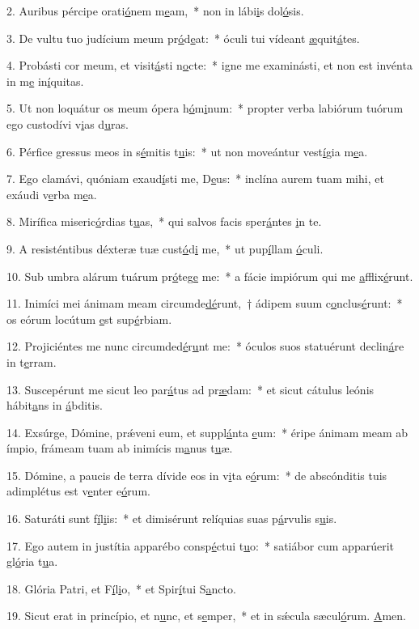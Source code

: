 2. Auribus pércipe orati\uline{ó}nem m\uline{e}am,~* non in lábi\uline{i}s dol\uline{ó}sis.\par 
3. De vultu tuo judícium meum pr\uline{ó}d\uline{e}at:~* óculi tui vídeant \uline{æ}quit\uline{á}tes.\par 
4. Probásti cor meum, et visit\uline{á}sti n\uline{o}cte:~* igne me examinásti, et non est invénta in m\uline{e} in\uline{í}quitas.\par 
5. Ut non loquátur os meum ópera h\uline{ó}m\uline{i}num:~* propter verba labiórum tuórum ego custodívi v\uline{i}as d\uline{u}ras.\par 
6. Pérfice gressus meos in s\uline{é}mitis t\uline{u}is:~* ut non moveántur vest\uline{í}gia m\uline{e}a.\par 
7. Ego clamávi, quóniam exaud\uline{í}sti me, D\uline{e}us:~* inclína aurem tuam mihi, et exáudi v\uline{e}rba m\uline{e}a.\par 
8. Mirífica miseric\uline{ó}rdias t\uline{u}as,~* qui salvos facis sper\uline{á}ntes \uline{i}n te.\par 
9. A resisténtibus déxteræ tuæ cust\uline{ó}d\uline{i} me,~* ut pup\uline{í}llam \uline{ó}culi.\par 
10. Sub umbra alárum tuárum pr\uline{ó}teg\uline{e} me:~* a fácie impiórum qui me \uline{a}fflix\uline{é}runt.\par 
11. Inimíci mei ánimam meam circumde\uline{dé}runt,~† ádipem suum c\uline{o}nclus\uline{é}runt:~* os eórum locútum \uline{e}st sup\uline{é}rbiam.\par 
12. Projiciéntes me nunc circumded\uline{é}r\uline{u}nt me:~* óculos suos statuérunt declin\uline{á}re in t\uline{e}rram.\par 
13. Suscepérunt me sicut leo par\uline{á}tus ad pr\uline{æ}dam:~* et sicut cátulus leónis hábit\uline{a}ns in \uline{á}bditis.\par 
14. Exsúrge, Dómine, prǽveni eum, et suppl\uline{á}nta \uline{e}um:~* éripe ánimam meam ab ímpio, frámeam tuam ab inimícis m\uline{a}nus t\uline{u}æ.\par 
15. Dómine, a paucis de terra dívide eos in v\uline{i}ta e\uline{ó}rum:~* de abscónditis tuis adimplétus est v\uline{e}nter e\uline{ó}rum.\par 
16. Saturáti sunt f\uline{í}l\uline{i}is:~* et dimisérunt relíquias suas p\uline{á}rvulis s\uline{u}is.\par 
17. Ego autem in justítia apparébo consp\uline{é}ctui t\uline{u}o:~* satiábor cum apparúerit gl\uline{ó}ria t\uline{u}a.\par 
18. Glória Patri, et F\uline{í}l\uline{i}o,~* et Spir\uline{í}tui S\uline{a}ncto.\par 
19. Sicut erat in princípio, et n\uline{u}nc, et s\uline{e}mper,~* et in sǽcula sæcul\uline{ó}rum. \uline{A}men.\par 
